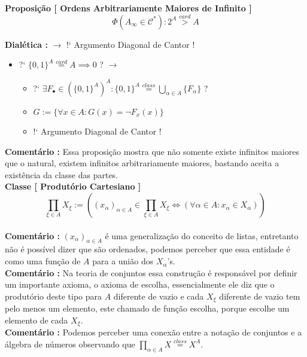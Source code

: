 \documentclass[10pt,a4paper]{report}
\begin{document}
\textbf{Proposição [ Ordens Arbitrariamente Maiores de Infinito ]} $$ \Phi( A_{\infty} \in \mathcal{C}^* ) : 2^A \overset{card}{>} A $$

\textbf{Dialética :} $\rightarrow$ !` Argumento Diagonal de Cantor !

\begin{itemize}
	\item[ ] ?` $ \{0,1\}^A \overset{card}{=} A \implies 0 $ ? $\rightarrow$
	\begin{itemize}
		\item[ ] ?` $ \exists F_{\bullet} \in ( \{0,1\}^A )^A : \{0,1\}^A \overset{class}{=} \bigcup\limits_{\alpha \in A} \{ F_{\alpha} \}  $ ?
		\item[ ] $ G := \{ \forall x \in A : G(x) = \neg F_x(x) \} $
		\item[ ] !` Argumento Diagonal de Cantor !
	\end{itemize}
\end{itemize}

\textbf{Comentário :} Essa proposição mostra que não somente existe infinitos maiores que o natural, existem infinitos arbitrariamente maiores, bastando aceita a existência da classe das partes.\\

\textbf{Classe [ Produtório Cartesiano ]} $$ \prod\limits_{\xi \in A} X_{\xi} := ( (x_{\alpha} )_{ \alpha \in A } \in \prod\limits_{\xi \in A} X_{\xi} \iff ( \forall \alpha \in A : x_{\alpha} \in X_{\alpha}   ) )  $$\\

\textbf{Comentário :} $ (x_{\alpha})_{\alpha \in A} $ é uma generalização do conceito de listas, entretanto não é possível dizer que são ordenados, podemos perceber que essa entidade é como uma função de $ A $ para a união dos $X_{\alpha}$'s.\\

\textbf{Comentário :} Na teoria de conjuntos essa construção é responsável por definir um importante axioma, o axioma de escolha, essencialmente ele diz que o produtório deste tipo para $A$ diferente de vazio e cada $X_{\xi}$ diferente de vazio tem pelo menos um elemento, este chamado de função escolha, porque escolhe um elemento de cada $X_{\xi}$.\\

\textbf{Comentário :} Podemos perceber uma conexão entre a notação de conjuntos e a álgebra de números observando que $ \prod\limits_{\alpha \in A} X \overset{class}{=} X^A  $.

\end{document}

